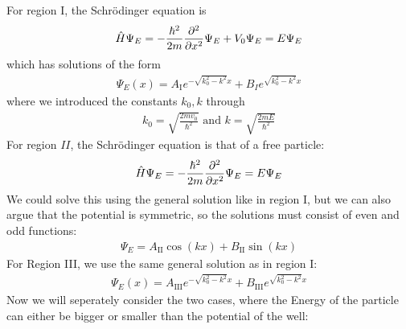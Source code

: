 For region I, the Schrödinger equation is
\begin{align*}
	\hat{H} \Psi_E = - \frac{\hbar^2}{2m} \frac{\partial^2}{\partial x^2} \Psi_E + V_0 \Psi_E = E \Psi_E	
\end{align*}
which has solutions of the form
\begin{align*}
	\Psi_E(x) = A_{\text{I}} e^{-\sqrt{k_0^2 - k^2}x} + B_I e^{\sqrt{k_0^2 - k^2}x}
\end{align*}
where we introduced the constants $k_0, k$ through
\begin{align*}
	k_0 = \sqrt{\frac{2mv_0}{\hbar^2}} \text{ and } k = \sqrt{\frac{2m E}{\hbar^2}}
\end{align*}
For region $II$, the Schrödinger equation is that of a free particle:
\begin{align*}
	\hat{H}\Psi_E = - \frac{\hbar^{2}}{2m}\frac{\partial^2}{\partial x^2}\Psi_E = E \Psi_E
\end{align*}
We could solve this using the general solution like in region I, but we can also argue that the potential is symmetric, so the solutions must consist of even and odd functions:
\begin{align*}
	\Psi_E = A_{\text{II}} \cos(kx) + B_{\text{II}}\sin(kx)
\end{align*}
For Region III, we use the same general solution as in region I:
\begin{align*}
	\Psi_E(x) = A_{\text{III}} e^{-\sqrt{k_0^2 - k^2}x} + B_{\text{III}} e^{\sqrt{k_0^2 - k^2}x}
\end{align*}
Now we will seperately consider the two cases, where the Energy of the particle can either be bigger or smaller than the potential of the well:
